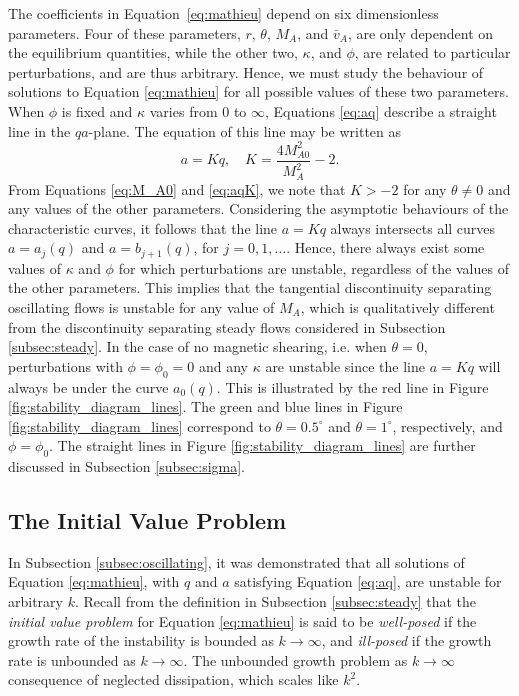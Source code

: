 \documentclass[12pt]{ociamthesis}
\begin{document}
The coefficients in Equation~\eqref{eq:mathieu} depend on six dimensionless parameters.
Four of these parameters, $r$, $\theta$, $M_A$, and $\bar v_A$, are only dependent on the equilibrium quantities, while the other two, $\kappa$, and $\phi$, are related to particular perturbations, and are thus arbitrary.
Hence, we must study the behaviour of solutions to Equation \eqref{eq:mathieu} for all possible values of these two parameters.
When $\phi$ is fixed and $\kappa$ varies from 0 to $\infty$, Equations \eqref{eq:aq} describe a straight line in the $qa$-plane.
The equation of this line may be written as 
%
\begin{equation}
\label{eq:aqK}
a = Kq, \quad K = \frac{4 M_{A 0}^2}{M_A^2} - 2.
\end{equation}
%
From Equations \eqref{eq:M_A0} and \eqref{eq:aqK}, we note that $K > -2$ for any $\theta \neq 0$ and any values of the other parameters.
Considering the asymptotic behaviours of the characteristic curves, it follows that the line $a = K q$ always intersects all curves $a = a_j(q)$ and $a = b_{j+1}(q)$, for $j = 0,1,\dots$.
Hence, there always exist some values of $\kappa$ and $\phi$ for which perturbations are unstable, regardless of the values of the other parameters.
This implies that the tangential discontinuity separating oscillating flows is unstable for any value of $M_A$, which is qualitatively different from the discontinuity separating steady flows considered in Subsection \ref{subsec:steady}.
In the case of no magnetic shearing, i.e. when $\theta = 0$, perturbations with $\phi = \phi_0 = 0$ and any $\kappa$ are unstable since the line $a = K q$ will always be under the curve $a_0(q)$.
This is illustrated by the red line in Figure \ref{fig:stability_diagram_lines}.
The green and blue lines in Figure \ref{fig:stability_diagram_lines} correspond to $\theta = 0.5^\circ$ and $\theta = 1^\circ$, respectively, and $\phi = \phi_0$.
The straight lines in Figure \ref{fig:stability_diagram_lines} are further discussed in Subsection \ref{subsec:sigma}.

\subsection{The Initial Value Problem}
\label{subsec:ivp}

In Subsection \ref{subsec:oscillating}, it was demonstrated that all solutions of Equation \eqref{eq:mathieu}, with $q$ and $a$ satisfying Equation \eqref{eq:aq}, are unstable for arbitrary $k$.
Recall from the definition in Subsection \ref{subsec:steady} that the \emph{initial value problem} for Equation \eqref{eq:mathieu} is said to be \emph{well-posed} if the growth rate of the instability is bounded as $k \to \infty$, and \emph{ill-posed} if the growth rate is unbounded as $k \to \infty$.
The unbounded growth problem as $k \to \infty$ consequence of neglected dissipation, which scales like $k^2$.
\end{document}
